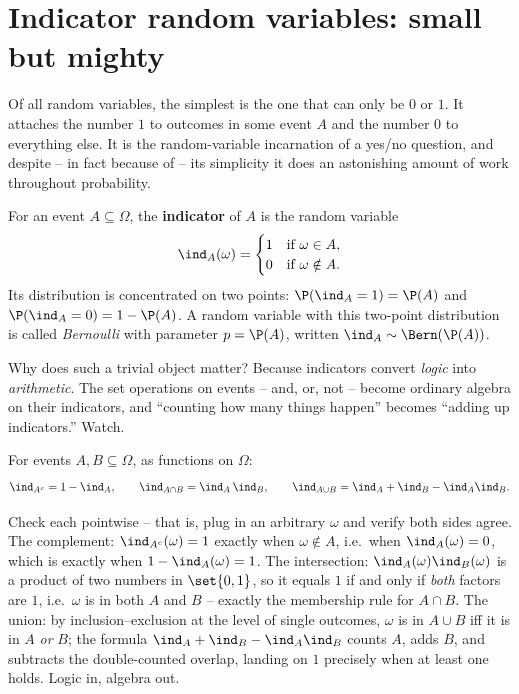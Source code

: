 \section{Indicator random variables: small but mighty}
\label{ch06:indicators}

Of all random variables, the simplest is the one that can only be $0$ or $1$. It
attaches the number $1$ to outcomes in some event $A$ and the number $0$ to everything
else. It is the random-variable incarnation of a yes/no question, and despite -- in
fact because of -- its simplicity it does an astonishing amount of work throughout
probability.

\begin{definition}
\label{ch06:def-indicator}
For an event $A \subseteq \Omega$, the \textbf{indicator} of $A$ is the random variable
\[
  \ind_A(\omega) =
  \begin{cases}
    1 & \text{if } \omega \in A, \\
    0 & \text{if } \omega \notin A.
  \end{cases}
\]
Its distribution is concentrated on two points: $\P(\ind_A = 1) = \P(A)$ and
$\P(\ind_A = 0) = 1 - \P(A)$. A random variable with this two-point distribution is
called \emph{Bernoulli} with parameter $p = \P(A)$, written $\ind_A \sim \Bern(\P(A))$.
\end{definition}

Why does such a trivial object matter? Because indicators convert \emph{logic} into
\emph{arithmetic}. The set operations on events -- and, or, not -- become ordinary
algebra on their indicators, and ``counting how many things happen'' becomes
``adding up indicators.'' Watch.

\begin{proposition}
\label{ch06:prop-indicator-dict}
For events $A, B \subseteq \Omega$, as functions on $\Omega$:
\[
  \ind_{A^c} = 1 - \ind_A, \qquad
  \ind_{A \cap B} = \ind_A \,\ind_B, \qquad
  \ind_{A \cup B} = \ind_A + \ind_B - \ind_A \ind_B.
\]
\end{proposition}

\begin{whybox}
Check each pointwise -- that is, plug in an arbitrary $\omega$ and verify both sides
agree. The complement: $\ind_{A^c}(\omega) = 1$ exactly when $\omega \notin A$, i.e.\
when $\ind_A(\omega) = 0$, which is exactly when $1 - \ind_A(\omega) = 1$. The
intersection: $\ind_A(\omega)\ind_B(\omega)$ is a product of two numbers in
$\set{0,1}$, so it equals $1$ if and only if \emph{both} factors are $1$, i.e.\ $\omega$
is in both $A$ and $B$ -- exactly the membership rule for $A \cap B$. The union: by
inclusion--exclusion at the level of single outcomes, $\omega$ is in $A \cup B$ iff it
is in $A$ \emph{or} $B$; the formula $\ind_A + \ind_B - \ind_A\ind_B$ counts $A$, adds
$B$, and subtracts the double-counted overlap, landing on $1$ precisely when at least
one holds. Logic in, algebra out.
\end{whybox}

